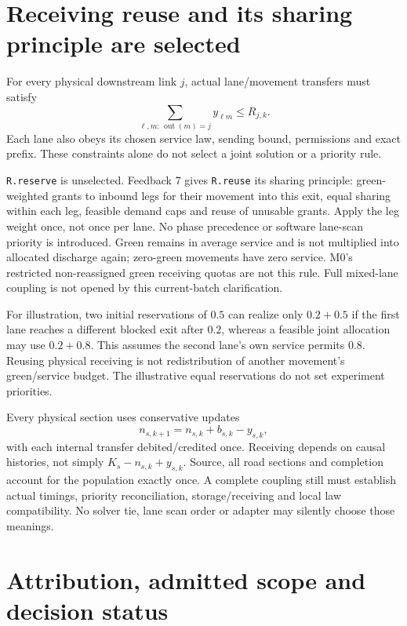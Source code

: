 \documentclass[11pt]{article}
\begin{document}
\section*{Receiving reuse and its sharing principle are selected}

For every physical downstream link $j$, actual lane/movement transfers must satisfy
\begin{equation}
 \sum_{\ell,m:\,\operatorname{out}(m)=j}y_{\ell m}\le R_{j,k}.
\end{equation}
Each lane also obeys its chosen service law, sending bound, permissions and exact prefix. These constraints alone do not select a joint solution or a priority rule.

\texttt{R.reserve} is unselected. Feedback 7 gives \texttt{R.reuse} its sharing principle: green-weighted grants to inbound legs for their movement into this exit, equal sharing within each leg, feasible demand caps and reuse of unusable grants. Apply the leg weight once, not once per lane. No phase precedence or software lane-scan priority is introduced. Green remains in average service and is not multiplied into allocated discharge again; zero-green movements have zero service. M0's restricted non-reassigned green receiving quotas are not this rule. Full mixed-lane coupling is not opened by this current-batch clarification.

For illustration, two initial reservations of $0.5$ can realize only $0.2+0.5$ if the first lane reaches a different blocked exit after $0.2$, whereas a feasible joint allocation may use $0.2+0.8$. This assumes the second lane's own service permits $0.8$. Reusing physical receiving is not redistribution of another movement's green/service budget. The illustrative equal reservations do not set experiment priorities.

Every physical section uses conservative updates
\begin{equation}
 n_{s,k+1}=n_{s,k}+b_{s,k}-y_{s,k},
\end{equation}
with each internal transfer debited/credited once. Receiving depends on causal histories, not simply $K_s-n_{s,k}+y_{s,k}$. Source, all road sections and completion account for the population exactly once. A complete coupling still must establish actual timings, priority reconciliation, storage/receiving and local law compatibility. No solver tie, lane scan order or adapter may silently choose those meanings.

\section*{Attribution, admitted scope and decision status}
\end{document}
